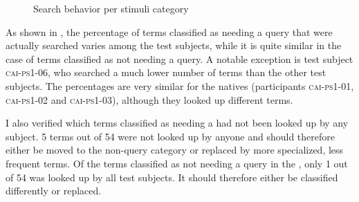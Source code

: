 \documentclass[output=paper]{langsci/langscibook}
\begin{document}
\begin{figure}
\caption{Search behavior per stimuli category\label{fig:prandi:9}}
\end{figure}

As shown in , the percentage of terms classified as needing a query that were actually searched varies among the test subjects, while it is quite similar in the case of terms classified as not needing a query. A notable exception is test subject \textsc{cai}-\textsc{ps1-06}, who searched a much lower number of terms than the other test subjects. The percentages are very similar for the  natives (participants \textsc{cai}-\textsc{ps1-01}, \textsc{cai}-\textsc{ps1-02} and \textsc{cai-ps1-03}), although they looked up different terms.

I also verified which terms classified as needing a  had not been looked up by any subject. 5 terms out of 54 were not looked up by anyone and should therefore either be moved to the non-query category or replaced by more specialized, less frequent terms. Of the terms classified as not needing a query in the , only 1 out of 54 was looked up by all test subjects. It should therefore either be classified differently or replaced. 
\end{document}

